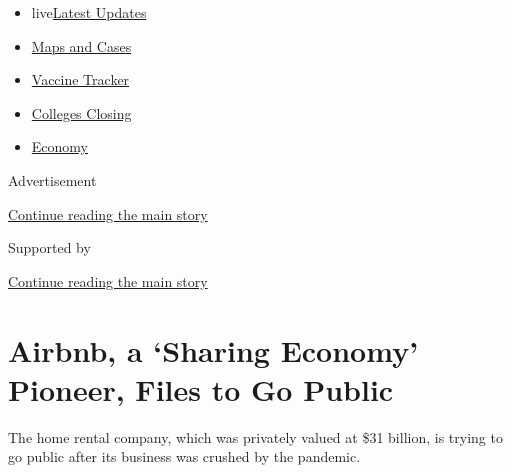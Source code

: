 \begin{itemize}
\tightlist
\item
  live\href{https://www.nytimes3xbfgragh.onion/2020/08/20/world/coronavirus-covid.html?name=styln-coronavirus-markets\&region=TOP_BANNER\&variant=undefined\&block=storyline_menu_recirc\&action=click\&pgtype=Article\&impression_id=fffd0601-e381-11ea-898b-95a22c820370}{Latest
  Updates}
\item
  \href{https://www.nytimes3xbfgragh.onion/interactive/2020/us/coronavirus-us-cases.html?name=styln-coronavirus-markets\&region=TOP_BANNER\&variant=undefined\&block=storyline_menu_recirc\&action=click\&pgtype=Article\&impression_id=fffd0602-e381-11ea-898b-95a22c820370}{Maps
  and Cases}
\item
  \href{https://www.nytimes3xbfgragh.onion/interactive/2020/science/coronavirus-vaccine-tracker.html?name=styln-coronavirus-markets\&region=TOP_BANNER\&variant=undefined\&block=storyline_menu_recirc\&action=click\&pgtype=Article\&impression_id=fffd2d10-e381-11ea-898b-95a22c820370}{Vaccine
  Tracker}
\item
  \href{https://www.nytimes3xbfgragh.onion/2020/08/19/us/colleges-closing-covid.html?name=styln-coronavirus-markets\&region=TOP_BANNER\&variant=undefined\&block=storyline_menu_recirc\&action=click\&pgtype=Article\&impression_id=fffd2d11-e381-11ea-898b-95a22c820370}{Colleges
  Closing}
\item
  \href{https://www.nytimes3xbfgragh.onion/live/2020/08/20/business/stock-market-today-coronavirus?name=styln-coronavirus-markets\&region=TOP_BANNER\&variant=undefined\&block=storyline_menu_recirc\&action=click\&pgtype=Article\&impression_id=fffd2d12-e381-11ea-898b-95a22c820370}{Economy}
\end{itemize}

Advertisement

\protect\hyperlink{after-top}{Continue reading the main story}

Supported by

\protect\hyperlink{after-sponsor}{Continue reading the main story}

\hypertarget{airbnb-a-sharing-economy-pioneer-files-to-go-public}{%
\section{Airbnb, a `Sharing Economy' Pioneer, Files to Go
Public}\label{airbnb-a-sharing-economy-pioneer-files-to-go-public}}

The home rental company, which was privately valued at \$31 billion, is
trying to go public after its business was crushed by the pandemic.

